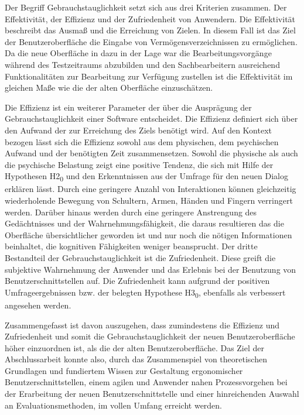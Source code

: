 Der Begriff Gebrauchstauglichkeit setzt sich aus drei Kriterien zusammen. Der Effektivität, der Effizienz und der Zufriedenheit von Anwendern. Die Effektivität beschreibt das Ausmaß und die Erreichung von Zielen. In diesem Fall ist das Ziel der Benutzeroberfläche die Eingabe von Vermögensverzeichnissen zu ermöglichen. Da die neue Oberfläche in dazu in der Lage war die Bearbeitungsvorgänge während des Testzeitraums abzubilden und den Sachbearbeitern ausreichend Funktionalitäten zur Bearbeitung zur Verfügung zustellen ist die Effektivität im gleichen Maße wie die der alten Oberfläche einzuschätzen.

Die Effizienz ist ein weiterer Parameter der über die Ausprägung der Gebrauchstauglichkeit einer Software entscheidet. Die Effizienz definiert sich über den Aufwand der zur Erreichung des Ziels benötigt wird. Auf den Kontext bezogen lässt sich die Effizienz sowohl aus dem physischen, dem psychischen Aufwand und der benötigten Zeit zusammensetzen. Sowohl die physische als auch die psychische Belastung zeigt eine positive Tendenz, die sich mit Hilfe der Hypothesen H2\textsubscript{0} und den Erkenntnissen aus der Umfrage für den neuen Dialog erklären lässt. Durch eine geringere Anzahl von Interaktionen können gleichzeitig wiederholende Bewegung von Schultern, Armen, Händen und Fingern verringert werden. Darüber hinaus werden durch eine geringere Anstrengung des Gedächtnisses und der Wahrnehmungsfähigkeit, die daraus resultieren das die Oberfläche übersichtlicher geworden ist und nur noch die nötigen Informationen beinhaltet, die kognitiven Fähigkeiten weniger beansprucht. Der dritte Bestandteil der Gebrauchstauglichkeit ist die Zufriedenheit. Diese greift die subjektive Wahrnehmung der Anwender und das Erlebnis bei der Benutzung von Benutzerschnittstellen auf. Die Zufriedenheit kann aufgrund der positiven Umfrageergebnissen bzw. der belegten Hypothese H3\textsubscript{0}, ebenfalls als verbessert angesehen werden.

Zusammengefasst ist davon auszugehen, dass zumindestens die Effizienz und Zufriedenheit und somit die Gebrauchstauglichkeit der neuen Benutzeroberfläche höher einzuordnen ist, als die der alten Benutzeroberfläche. Das Ziel der Abschlussarbeit konnte also, durch das Zusammenspiel von theoretischen Grundlagen und fundiertem Wissen zur Gestaltung ergonomischer Benutzerschnittstellen, einem agilen und Anwender nahen Prozessvorgehen bei der Erarbeitung der neuen Benutzerschnittstelle und einer hinreichenden Auswahl an Evaluationsmethoden, im vollen Umfang erreicht werden.